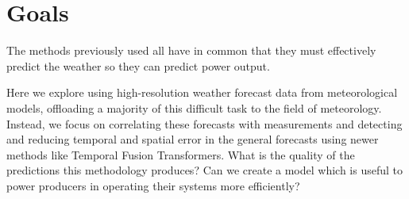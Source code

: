 \section{Goals}
The methods previously used all have in common that they must effectively predict the weather so they can predict power output.


Here we explore using high-resolution weather forecast data from meteorological models, offloading a majority of this difficult task to the field of meteorology. Instead, we focus on correlating these forecasts with measurements and detecting and reducing temporal and spatial error in the general forecasts using newer methods like Temporal Fusion Transformers.
What is the quality of the predictions this methodology produces? Can we create a model which is useful to power producers in operating their systems more efficiently?







